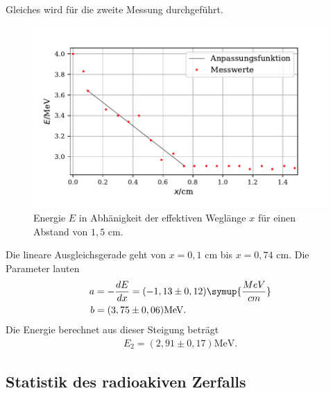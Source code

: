 Gleiches wird für die zweite Messung durchgeführt. 
\begin{figure}[H]
  \centering
  \includegraphics{plot4.pdf}
  \caption{Energie $E$ in Abhänigkeit der effektiven Weglänge $x$ für einen Abstand von $1,5$ $\si{\cm}$. }
  \label{fig:plot}
\end{figure}
Die lineare Ausgleichsgerade geht von $x=0,1$ $\si{\cm}$ bis $x=0,74$ $\si{\cm}$. Die Parameter lauten
\begin{align*}
a &= -\frac{dE}{dx} = (-1,13 \pm 0,12) \symup{\frac{MeV}{cm}} \\
b &= (3,75 \pm 0,06) \si{\MeV}.
\end{align*}
Die Energie berechnet aus dieser Steigung beträgt
\begin{align*}
E_2 = (2,91 \pm 0,17) \si{\MeV}. %
\end{align*}



\subsection{Statistik des radioakiven Zerfalls}

